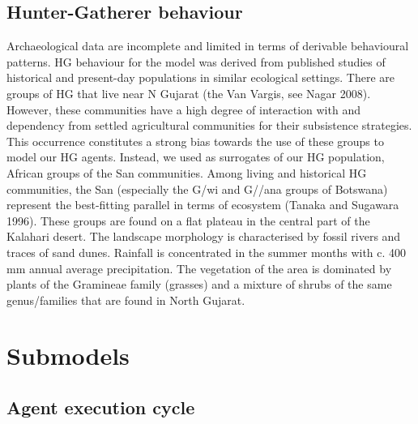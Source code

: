 \documentclass[11pt,oneside,a4paper,openright]{report}
\begin{document}
\subsection{Hunter-Gatherer behaviour}
Archaeological data are incomplete and limited in terms of derivable behavioural patterns. HG
behaviour for the model was derived from published studies of historical and present-day populations
in similar ecological settings. There are groups of HG that live near N Gujarat (the Van Vargis, see
Nagar 2008). However, these communities have a high degree of interaction with and dependency
from settled agricultural communities for their subsistence strategies. This occurrence constitutes a
strong bias towards the use of these groups to model our HG agents. Instead, we used as surrogates
of our HG population, African groups of the San communities.
Among living and historical HG communities, the San (especially the G/wi and G//ana groups of
Botswana) represent the best-fitting parallel in terms of ecosystem (Tanaka and Sugawara 1996).
These groups are found on a flat plateau in the central part of the Kalahari desert. The landscape
morphology is characterised by fossil rivers and traces of sand dunes. Rainfall is concentrated in the
summer months with c. 400 mm annual average precipitation. The vegetation of the area is dominated
by plants of the Gramineae family (grasses) and a mixture of shrubs of the same genus/families that
are found in North Gujarat.


\section{Submodels}

\subsection{Agent execution cycle}



	
\end{document}
